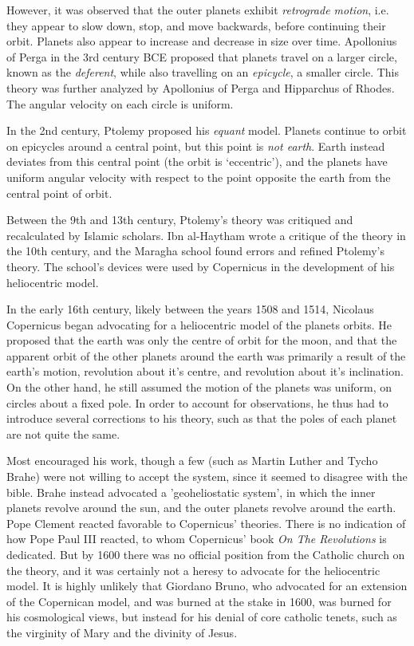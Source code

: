 However, it was observed that the outer planets exhibit \emph{retrograde motion}, i.e. they appear to slow down, stop, and move backwards, before continuing their orbit. Planets also appear to increase and decrease in size over time. Apollonius of Perga in the 3rd century BCE proposed that planets travel on a larger circle, known as the \emph{deferent}, while also travelling on an \emph{epicycle}, a smaller circle. This theory was further analyzed by Apollonius of Perga and Hipparchus of Rhodes. The angular velocity on each circle is uniform.

In the 2nd century, Ptolemy proposed his \emph{equant} model. Planets continue to orbit on epicycles around a central point, but this point is \emph{not earth}. Earth instead deviates from this central point (the orbit is `eccentric'), and the planets have uniform angular velocity with respect to the point opposite the earth from the central point of orbit.

Between the 9th and 13th century, Ptolemy's theory was critiqued and recalculated by Islamic scholars. Ibn al-Haytham wrote a critique of the theory in the 10th century, and the Maragha school found errors and refined Ptolemy's theory. The school's devices were used by Copernicus in the development of his heliocentric model.

In the early 16th century, likely between the years 1508 and 1514, Nicolaus Copernicus began advocating for a heliocentric model of the planets orbits. He proposed that the earth was only the centre of orbit for the moon, and that the apparent orbit of the other planets around the earth was primarily a result of the earth's motion, revolution about it's centre, and revolution about it's inclination. On the other hand, he still assumed the motion of the planets was uniform, on circles about a fixed pole. In order to account for observations, he thus had to introduce several corrections to his theory, such as that the poles of each planet are not quite the same.

Most encouraged his work, though a few (such as Martin Luther and Tycho Brahe) were not willing to accept the system, since it seemed to disagree with the bible. Brahe instead advocated a 'geoheliostatic system', in which the inner planets revolve around the sun, and the outer planets revolve around the earth. Pope Clement reacted favorable to Copernicus' theories. There is no indication of how Pope Paul III reacted, to whom Copernicus' book \emph{On The Revolutions} is dedicated. But by 1600 there was no official position from the Catholic church on the theory, and it was certainly not a heresy to advocate for the heliocentric model. It is highly unlikely that Giordano Bruno, who advocated for an extension of the Copernican model, and was burned at the stake in 1600, was burned for his cosmological views, but instead for his denial of core catholic tenets, such as the virginity of Mary and the divinity of Jesus.

